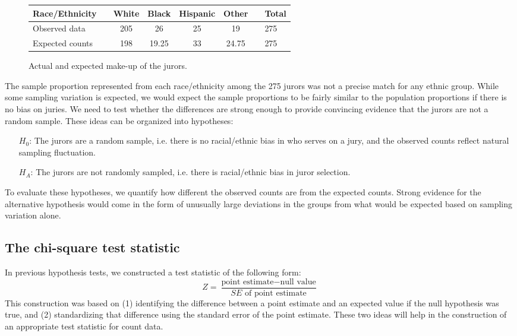 \begin{figure}[h]
\centering
\begin{tabular}{ll ccc c ll}
\hline
Race/Ethnicity	 & \hspace{2mm} & White & Black & Hispanic & Other & \hspace{2mm} & Total \\
\hline
Observed data			&	& 205 & 26	& 25 & 19	&	& 275 \\
Expected counts	 &	& 198 & 19.25 & 33 & 24.75 & & 275 \\
\hline
\end{tabular}
\caption{Actual and expected make-up of the jurors.}
\label{expectedJuryRepresentationIfNoBias}
\end{figure}

The sample proportion represented from each race/ethnicity among the 275 jurors was not a precise match for any ethnic group. While some sampling variation is expected, we would expect the sample proportions to be fairly similar to the population proportions if there is no bias on juries. We need to test whether the differences are strong enough to provide convincing evidence that the jurors are not a random sample. These ideas can be organized into hypotheses:
\begin{itemize}
\setlength{\itemsep}{0mm}
\item[$H_0$:] The jurors are a random sample, i.e. there is no racial/ethnic bias in who serves on a jury, and the observed counts reflect natural sampling fluctuation.
\item[$H_A$:] The jurors are not randomly sampled, i.e. there is racial/ethnic bias in juror selection.
\end{itemize}
To evaluate these hypotheses, we quantify how different the observed counts are from the expected counts. Strong evidence for the alternative hypothesis would come in the form of unusually large deviations in the groups from what would be expected based on sampling variation alone.


\subsection{The chi-square test statistic}
\label{chiSquareTestStatistic}

In previous hypothesis tests, we constructed a test statistic of the following form:
$$ Z = \frac{\text{point estimate} - \text{null value}}{SE \text{ of point estimate}} $$
This construction was based on (1) identifying the difference between a point estimate and an expected value if the null hypothesis was true, and (2) standardizing that difference using the standard error of the point estimate. These two ideas will help in the construction of an appropriate test statistic for count data.

